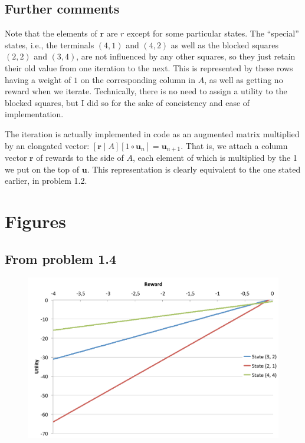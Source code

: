 \documentclass[letterpaper, 10pt]{article}
\begin{document}

\subsection{Further comments} 
\label{ssec:furthercomments}
Note that the elements of $\mathbf{r}$ are $r$ except for some particular states.
The ``special'' states, i.e., the terminals $(4, 1)$ and $(4, 2)$ as well as the blocked squares $(2,2)$ and $(3, 4)$, are not influenced by any other squares, so they just retain their old value from one iteration to the next. 
This is represented by these rows having a weight of $1$ on the corresponding column in $A$, as well as getting no reward when we iterate. 
Technically, there is no need to assign a utility to the blocked squares, but I did so for the sake of concistency and ease of implementation.

The iteration is actually implemented in code as an augmented matrix multiplied by an elongated vector: 
$[\mathbf{r} \mid \! A] [1 \circ \mathbf{u}_n] = \mathbf{u}_{n+1}$. 
That is, we attach a column vector $\mathbf{r}$ of rewards to the side of $A$, each element of which is multiplied by the 1 we put on the top of $\mathbf{u}$.
This representation is clearly equivalent to the one stated earlier, in problem 1.2.

\clearpage
\section{Figures}
\subsection{From problem 1.4}
\label{ssec:prob14fig}
\vfill
\begin{figure}[h]
	\centering
	\includegraphics[width=\textwidth]{prob14}
	\caption{}
	\label{fig:prob14}
\end{figure}
\vfill
\end{document}
